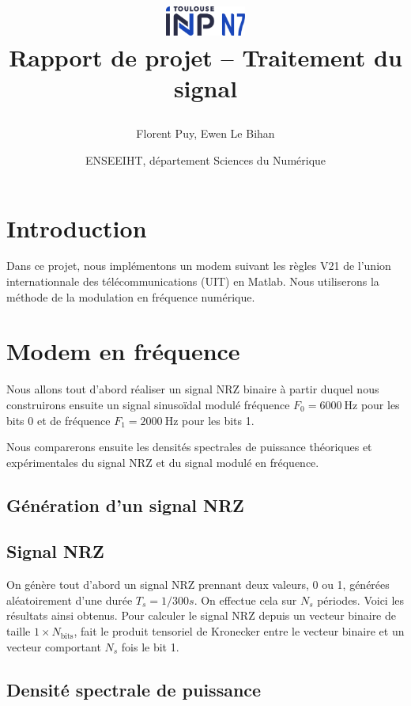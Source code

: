 \documentclass{article}
\title{
\includegraphics[width=0.2\textwidth]{n7.png}
\\[1cm]
Rapport de projet -- Traitement du signal

}
\author{Florent Puy, Ewen Le Bihan}
\date{ENSEEIHT, département Sciences du Numérique}
\begin{document}
\maketitle

\tableofcontents

\section{Introduction}

Dans ce projet, nous implémentons un modem suivant les règles V21 de l'union internationnale des télécommunications (UIT) en Matlab. Nous utiliserons la méthode de la modulation en fréquence numérique.

\setcounter{section}{2}

\section{Modem en fréquence}

Nous allons tout d'abord réaliser un signal NRZ binaire à partir duquel nous construirons ensuite un signal sinusoïdal modulé fréquence $F_0=\SI{6000}{\hertz}$ pour les bits 0 et de fréquence $F_1=\SI{2000}{\hertz}$ pour les bits 1.

Nous comparerons ensuite les densités spectrales de puissance théoriques et expérimentales du signal NRZ et du signal modulé en fréquence.

\subsection{Génération d'un signal NRZ}

\subsection{Signal NRZ}


On génère tout d'abord un signal NRZ prennant deux valeurs, 0 ou 1, générées aléatoirement d'une durée $T_s=1/300 s$. On effectue cela sur $N_s$ périodes. Voici les résultats ainsi obtenus. Pour calculer le signal NRZ depuis un vecteur binaire de taille $1 \times N_\text{bits}$, fait le produit tensoriel de Kronecker entre le vecteur binaire et un vecteur comportant $N_s$ fois le bit 1.



\subsection{Densité spectrale de puissance}
\end{document}
